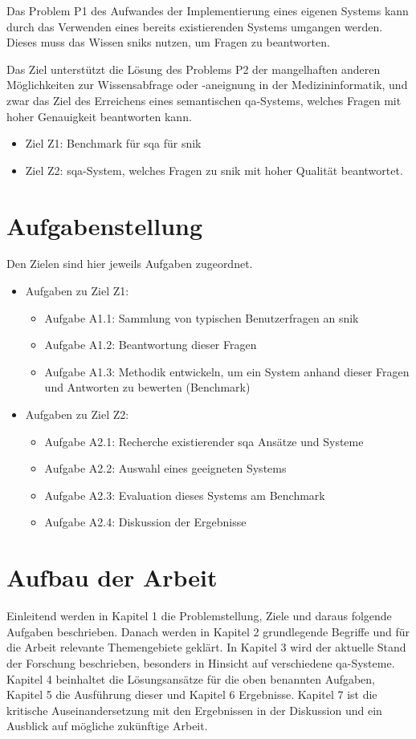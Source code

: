 Das Problem P1 des Aufwandes der Implementierung eines eigenen Systems kann durch das Verwenden eines bereits existierenden Systems umgangen werden.
Dieses muss das Wissen \acs{snik}s nutzen, um Fragen zu beantworten.

Das Ziel unterstützt die Lösung des Problems P2 der mangelhaften anderen Möglichkeiten zur Wissensabfrage oder -aneignung in der Medizininformatik,
und zwar das Ziel des Erreichens eines semantischen \acl*{qa}-Systems, welches Fragen mit hoher Genauigkeit beantworten kann.

\begin{itemize}
	\item Ziel Z1: Benchmark für \acl*{sqa} für \acs{snik}
	\item Ziel Z2: \acl*{sqa}-System, welches Fragen zu \acs{snik} mit hoher Qualität beantwortet.
\end{itemize}
\section{Aufgabenstellung}

Den Zielen sind hier jeweils Aufgaben zugeordnet.

\begin{itemize}

	\item Aufgaben zu Ziel Z1:
	\begin{itemize}
		\item Aufgabe A1.1: Sammlung von typischen Benutzerfragen an \acs{snik}
		\item Aufgabe A1.2: Beantwortung dieser Fragen
		\item Aufgabe A1.3: Methodik entwickeln, um ein System anhand dieser Fragen und Antworten zu bewerten (Benchmark)
	\end{itemize}
	\item Aufgaben zu Ziel Z2:
	\begin{itemize}
		\item Aufgabe A2.1: Recherche existierender \acl*{sqa} Ansätze und Systeme
		\item Aufgabe A2.2: Auswahl eines geeigneten Systems
		\item Aufgabe A2.3: Evaluation dieses Systems am Benchmark
		\item Aufgabe A2.4: Diskussion der Ergebnisse
	\end{itemize}
\end{itemize}

\section{Aufbau der Arbeit}

Einleitend werden in Kapitel 1 die Problemstellung, Ziele und daraus folgende Aufgaben beschrieben.
Danach werden in Kapitel 2 grundlegende Begriffe und für die Arbeit relevante Themengebiete geklärt.
In Kapitel 3 wird der aktuelle Stand der Forschung beschrieben, besonders in Hinsicht auf verschiedene \acl*{qa}-Systeme.
Kapitel 4 beinhaltet die Lösungsansätze für die oben benannten Aufgaben, Kapitel 5 die Ausführung dieser und Kapitel 6 Ergebnisse.
Kapitel 7 ist die kritische Auseinandersetzung mit den Ergebnissen in der Diskussion und ein Ausblick auf mögliche zukünftige Arbeit.
